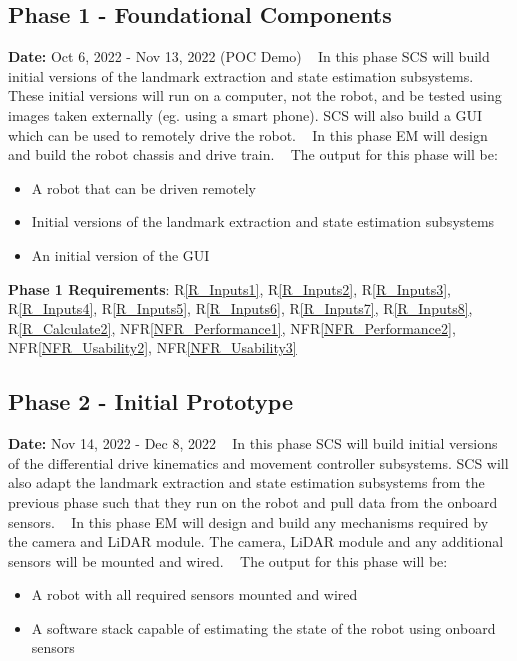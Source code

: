 \documentclass[12pt]{article}
\newcommand{\rref}[1]{R\ref{#1}}
\newcommand{\nfrref}[1]{NFR\ref{#1}}
\begin{document}
\subsection{Phase 1 - Foundational Components}
\textbf{Date:} Oct 6, 2022 - Nov 13, 2022 (POC Demo)
\ \newline\newline
In this phase SCS will build initial versions of the landmark extraction and state
estimation subsystems. These initial versions will run on a computer, not the robot,
and be tested using images taken externally (eg. using a smart phone). SCS will also build
a GUI which can be used to remotely drive the robot.
\ \newline\newline
In this phase EM will design and build the robot chassis and drive train. 
\ \newline\newline
The output for this phase will be:
\begin{itemize}
\item A robot that can be driven remotely
\item Initial versions of the landmark extraction and state estimation subsystems
\item An initial version of the GUI
\end{itemize}

\noindent \textbf{Phase 1 Requirements}: \rref{R_Inputs1}, \rref{R_Inputs2}, \rref{R_Inputs3}, \rref{R_Inputs4}, \rref{R_Inputs5}, \rref{R_Inputs6}, \rref{R_Inputs7}, \rref{R_Inputs8}, \rref{R_Calculate2}, \nfrref{NFR_Performance1}, \nfrref{NFR_Performance2}, \nfrref{NFR_Usability2}, \nfrref{NFR_Usability3}

\subsection{Phase 2 - Initial Prototype}
\textbf{Date:} Nov 14, 2022 - Dec 8, 2022
\ \newline\newline
In this phase SCS will build initial versions of the differential drive kinematics and
movement controller subsystems. SCS will also adapt the landmark extraction and state estimation
subsystems from the previous phase such that they run on the robot and pull data from
the onboard sensors.
\ \newline\newline
In this phase EM will design and build any mechanisms required by the camera and LiDAR module.
The camera, LiDAR module and any additional sensors will be mounted and wired. 
\ \newline\newline
The output for this phase will be:
\begin{itemize}
\item A robot with all required sensors mounted and wired
\item A software stack capable of estimating the state of the robot using onboard sensors
\end{itemize}
\end{document}

